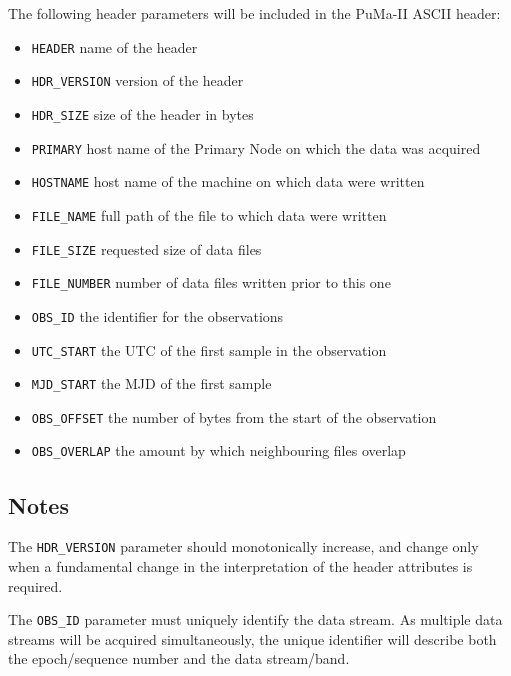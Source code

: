 The following header parameters will be included in the PuMa-II ASCII header:
\begin{itemize}
\item{\tt HEADER} name of the header

\item{\tt HDR\_VERSION} version of the header

\item{\tt HDR\_SIZE} size of the header in bytes

\item{\tt PRIMARY} host name of the Primary Node on which the data was acquired

\item{\tt HOSTNAME} host name of the machine on which data were written

\item{\tt FILE\_NAME} full path of the file to which data were written

\item{\tt FILE\_SIZE} requested size of data files

\item{\tt FILE\_NUMBER} number of data files written prior to this one

\item{\tt OBS\_ID} the identifier for the observations

\item{\tt UTC\_START} the UTC of the first sample in the observation

\item{\tt MJD\_START} the MJD of the first sample

\item{\tt OBS\_OFFSET} the number of bytes from the start of the observation

\item{\tt OBS\_OVERLAP} the amount by which neighbouring files overlap
\end{itemize}

\subsection{Notes}

The {\tt HDR\_VERSION} parameter should monotonically increase, and
change only when a fundamental change in the interpretation of the
header attributes is required.

The {\tt OBS\_ID} parameter must uniquely identify the data stream.
As multiple data streams will be acquired simultaneously, the unique
identifier will describe both the epoch/sequence number and the data
stream/band.

